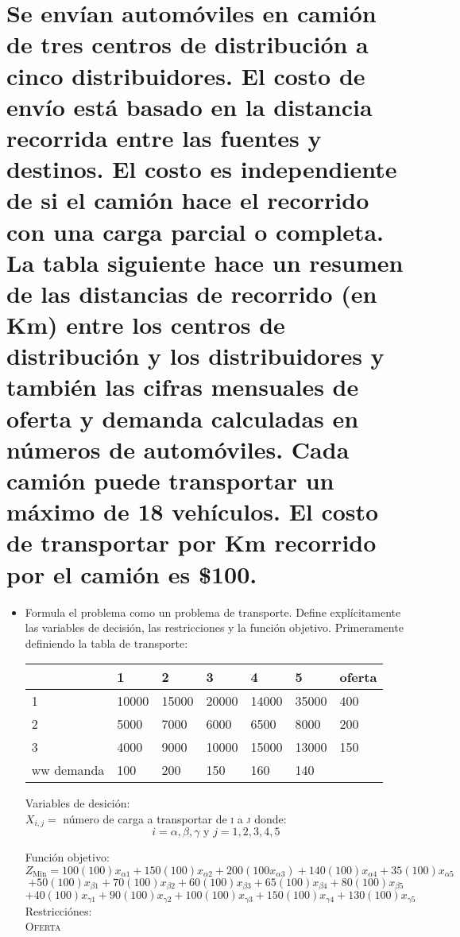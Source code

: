 \section{Se envían automóviles en camión de tres centros de distribución a cinco distribuidores.
El costo de envío está basado en la distancia recorrida entre las fuentes y destinos. El costo
es independiente de si el camión hace el recorrido con una carga parcial o completa. La tabla
siguiente hace un resumen de las distancias de recorrido (en Km) entre los centros de
distribución y los distribuidores y también las cifras mensuales de oferta y demanda
calculadas en números de automóviles. Cada camión puede transportar un máximo de 18
vehículos. El costo de transportar por Km recorrido por el camión es \$100.}

\begin{itemize}
    \item Formula el problema como un problema de transporte. Define
explícitamente las variables de decisión, las restricciones y la función objetivo.
    Primeramente definiendo la tabla de transporte:
        \centering
    \begin{tabular}{|l|l|l|l|l|l|l|}
    \hline
        ~ & 1 & 2 & 3 & 4 & 5 & oferta \\ \hline
        1 & 10000 & 15000 & 20000 & 14000 & 35000 & 400 \\ \hline
        2 & 5000 & 7000 & 6000 & 6500 & 8000 & 200 \\ \hline
        3 & 4000 & 9000 & 10000 & 15000 & 13000 & 150 \\ \hline
       ww demanda & 100 & 200 & 150 & 160 & 140 & ~ \\ \hline
    \end{tabular}
    Variables de desici\'on:\\ 
    $X_{i,j}=$ n\'umero de carga a transportar de \textsc{i} a \textsc{j} donde:
    $$i=\alpha, \beta, \gamma \mbox{ y } j=1,2,3,4,5$$
    
    Funci\'on objetivo:\\
    $$Z_{\mbox{Min}}=100(100)x_{\alpha 1}+150(100)x_{\alpha 2}+200(100x_{\alpha 3})+140(100)x_{\alpha 4}+35(100)x_{\alpha 5}$$
    $$+50(100)x_{\beta 1}+70(100)x_{\beta 2}+60(100)x_{\beta 3}+65(100)x_{\beta 4}+80(100)x_{\beta 5}$$
    $$+40(100)x_{\gamma 1} +90(100)x_{\gamma 2}+100(100)x_{\gamma 3}+150(100)x_{\gamma 4}+130(100)x_{\gamma 5}$$
    \newpage 
    Restricci\'ones:\\

    \textsc{Oferta}
    

\end{itemize}
